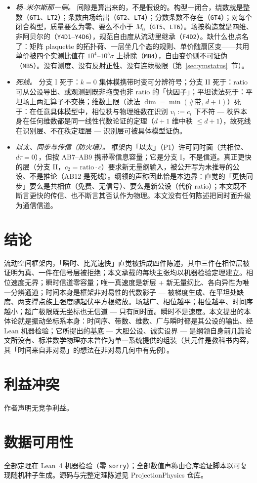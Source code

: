 \documentclass[aps,prd,preprint,superscriptaddress,amsmath,amssymb]{revtex4-2}
\begin{document}
\begin{itemize}
\item \emph{杨--米尔斯那一侧。} 间隙是算出来的，不是假设的。构型一闭合，绕数就是整数（\texttt{GT1}、\texttt{LT2}）；条数由场给出（\texttt{GT2}、\texttt{LT4}）；分数条数不存在（\texttt{GT4}）；对每个闭合构型，质量要么为零、要么不小于 $M_0$（\texttt{GT5}、\texttt{LT6}）。场按构造就是四维、非阿贝尔的（\texttt{Y4D1}--\texttt{Y4D6}），规范自由度从流动里继承（\texttt{F4D2}）。缺什么也点名了：矩阵 plaquette 的拓扑荷、一层坐几个态的规则、单价随扇区变——共用单价被四个实测比值在 $10^4$--$10^5\sigma$ 上排除（\texttt{MB4}），自由变价则不可证伪（\texttt{MB5}）。没有测度、没有反射正性、没有连续极限（第~\ref{sec:ymstatus}~节）。
\item \emph{死线。} 分支 I 死于：$k=0$ 集体模携带时变可分辨符号；分支 II 死于：ratio 可从公设导出、或观测到既非拖曳也非 ratio 的「快因子」；平坦读法死于：平坦场上两汇算子不交换；维数上限（读法 $\dim=\min(\#\text{带},\,d+1)$）死于：在任意具体模型中，相位秩与物理维数在识别 $v_i:=c_i$ 下不符 --- 秩界本身在任何维数都是同一线性代数论证的定理（$d+1$ 维中秩 $\le d+1$），故死线在识别层、不在秩定理层 --- 识别层可被具体模型证伪。
\item \emph{以太、同步与传信（防火墙）。} 框架内「以太」（P1）许可同时面（共相位、$d\tau=0$），但按 AB7--AB9 携带零信息容量；它是分支 I，不是信道。真正更快的层（分支 II，$c_2=\mathrm{ratio}\cdot c$）要求新无量纲输入，被公开写为未推导的公设、不是推论（AB12 是死线）。纲领的声称因此恰是本边界：直觉的「更快同步」要么是共相位（免费、无信号）、要么是新公设（代价 ratio）；本文既不断言更快的传信、也不断言其否认作为物理。本文没有任何陈述把同时面升级为通信信道。
\end{itemize}

\section{结论}
\label{sec:conclusion}

流动空间框架内，「瞬时、比光速快」直觉被拆成四件陈述，其中三件在相位层被证明为真、一件在信号层被拒绝；本文承载的每块主张均以机器检验定理建立。相位速度无界；瞬时信道零容量；唯一真速度是新层 + 新无量纲比、各向异性为唯一分辨通道；时间本身是框架非对易性的代数影子 --- 被梯度生成、在平坦处缺席、两支撑点族上强度随起伏平方根缩放。场越广、相位越平；相位越平、时间序越小；超广极限既无坐标也无信道 --- 只有同时面。瞬时不是速度。本文提出的本体论就是振动坐标系本身：时间序、带数、维数、广与瞬时都是其公设的输出、经 Lean 机器检验；它所提出的基底 --- 大胆公设、诚实设界 --- 是纲领自身前几篇论文所没有、标准数学物理亦未曾作为单一系统提供的组装（其元件是教科书内容，其「时间来自非对易」的想法在非对易几何中有先例）。

\section*{利益冲突}
作者声明无竞争利益。

\section*{数据可用性}
全部定理在 Lean~4 机器检验（零 \texttt{sorry}）；全部数值声称由仓库验证脚本以可复现随机种子生成。源码与完整定理陈述见 ProjectionPhysics 仓库。


\end{document}
